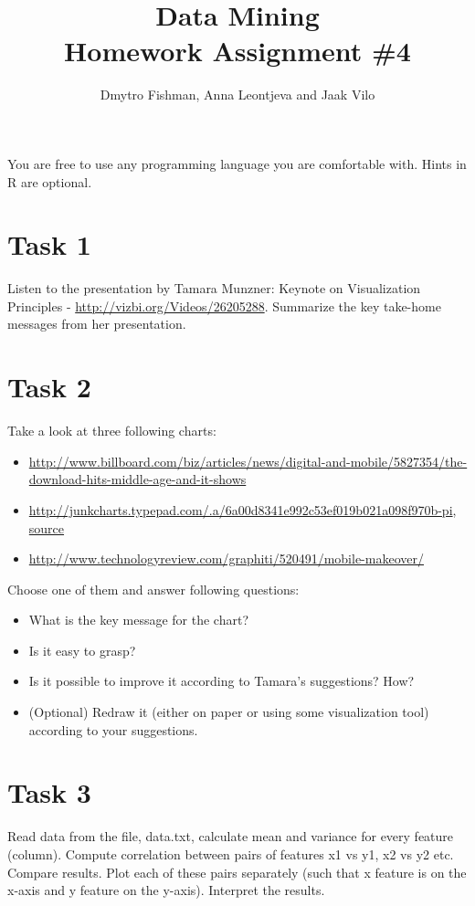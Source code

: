 \documentclass{article}
\title{Data Mining\\Homework Assignment \#4} %
\author{Dmytro Fishman, Anna Leontjeva and Jaak Vilo} %
\begin{document}
\maketitle %

You are free to use any programming language you are comfortable with. Hints in R are optional.

\section*{Task 1}
Listen to the presentation by Tamara Munzner: Keynote on Visualization Principles - \url{http://vizbi.org/Videos/26205288}. Summarize the key take-home messages from her presentation.

\section*{Task 2}
Take a look at three following charts:
\begin{itemize}
\item \url{http://www.billboard.com/biz/articles/news/digital-and-mobile/5827354/the-download-hits-middle-age-and-it-shows}
\item \url{http://junkcharts.typepad.com/.a/6a00d8341e992c53ef019b021a098f970b-pi}, \href{http://www.scientificamerican.com/article/the-truth-about-chinas-patent-boom/}{source}
\item \url{http://www.technologyreview.com/graphiti/520491/mobile-makeover/}
\end{itemize}

Choose one of them and answer following questions:
\begin{itemize}
\item What is the key message for the chart?
\item Is it easy to grasp?
\item Is it possible to improve it according to Tamara's suggestions? How?
\item (Optional) Redraw it (either on paper or using some visualization tool) according to your suggestions.
\end{itemize} 

\section*{Task 3}
Read data from the file, data.txt, calculate mean and variance for every feature (column). Compute correlation between pairs of features x1 vs y1, x2 vs y2 etc. Compare results. Plot each of these pairs separately (such that x feature is on the x-axis and y feature on the y-axis). Interpret the results. %
\end{document}
